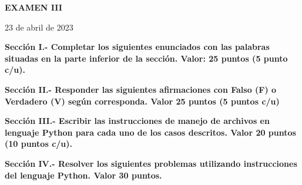 \documentclass[10pt,addpoints]{exam}
\begin{document}
\begin{center}
  \sffamily\textbf{EXAMEN III}
\end{center}
\begin{flushright}
23 de abril de 2023
\end{flushright}

\begin{questions}
\begin{EnvFullwidth}
  \sffamily\textbf{Sección I.- Completar los siguientes enunciados con las
  palabras situadas en la parte inferior de la sección. Valor: 25 puntos
  (5 punto c/u).}
\end{EnvFullwidth}








\end{questions}

\begin{questions}
\begin{EnvFullwidth}
  \sffamily\textbf{Sección II.- Responder las siguientes afirmaciones con
  Falso (F) o Verdadero (V) según corres\-ponda. Valor 25 puntos (5 puntos c/u)}
\end{EnvFullwidth}







\end{questions}


\begin{questions}
\begin{EnvFullwidth}
  \sffamily\textbf{Sección III.- Escribir las instrucciones de manejo de
  archivos en lenguaje Python para cada uno de los casos descritos. Valor 20
  puntos (10 puntos c/u).
  }
\end{EnvFullwidth}



%

\end{questions}

\begin{questions}
\begin{EnvFullwidth}
  \sffamily\textbf{Sección IV.- Resolver los siguientes problemas utilizando
  instrucciones del lenguaje Python. Valor 30 puntos.
  }
\end{EnvFullwidth}


%
%

\end{questions}
\end{document}
